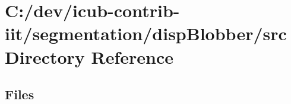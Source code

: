 \section{C\+:/dev/icub-\/contrib-\/iit/segmentation/disp\+Blobber/src Directory Reference}
\label{dir_b7ba5d5dedca9ad723d302c2b8efc3fd}
\subsection*{Files}
\begin{DoxyCompactItemize}
\end{DoxyCompactItemize}
